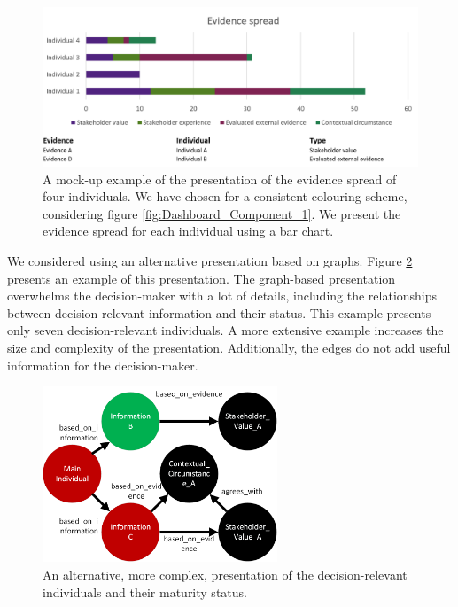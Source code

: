\begin{figure}[H]
\centering
  \includegraphics[width=16cm]{../../Images/04_Contribution/04_DecisionPresentationPattern_Component3_Example_Spread.png}
  \caption{A mock-up example of the presentation of the evidence spread of four individuals. We have chosen for a consistent colouring scheme, considering figure \ref{fig:Dashboard_Component_1}. We present the evidence spread for each individual using a bar chart.}
  \label{fig:Dashboard_Component_3_Spread}
\end{figure} 

We considered using an alternative presentation based on graphs. Figure \ref{fig:Dashboard_Component_3_Alternative} presents an example of this presentation. The graph-based presentation overwhelms the decision-maker with a lot of details, including the relationships between decision-relevant information and their status. This example presents only seven decision-relevant individuals. A more extensive example increases the size and complexity of the presentation. Additionally, the edges do not add useful information for the decision-maker.

\begin{figure}[H]
\centering
  \includegraphics[width=7cm]{../../Images/04_Contribution/04_DecisionPresentationPattern_Component3_Example_Alternative.png}
  \caption{An alternative, more complex, presentation of the decision-relevant individuals and their maturity status.}
  \label{fig:Dashboard_Component_3_Alternative}
\end{figure} 